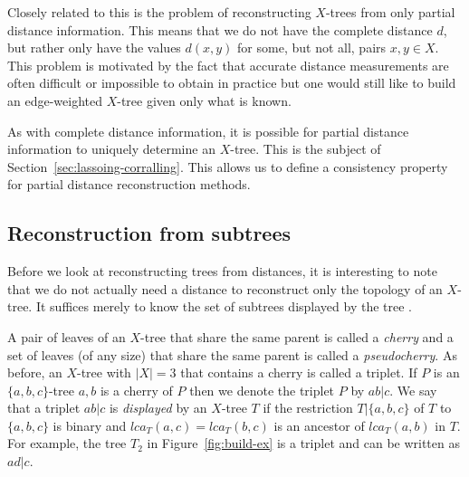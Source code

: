 Closely related to this is the problem of reconstructing $X$-trees from only
partial distance information.  This means that we do not have the complete
distance $d$, but rather only have the values $d(x,y)$ for some, but not all,
pairs $x,y \in X$.  This problem is motivated by the fact that accurate
distance measurements are often difficult or impossible to obtain in practice
but one would still like to build an edge-weighted $X$-tree given only what is
known.

As with complete distance information, it is possible for partial distance
information to uniquely determine an $X$-tree.  This is the subject of
Section~\ref{sec:lassoing-corralling}.  This allows us to define a consistency
property for partial distance reconstruction methods.

\subsection{Reconstruction from subtrees}
\label{sec:constr-from-subtr}

Before we look at reconstructing trees from distances, it is interesting to
note that we do not actually need a distance to reconstruct only the topology
of an $X$-tree.  It suffices merely to know the set of subtrees displayed by
the tree \cite{semple2003phylogenetics}.

A pair of leaves of an $X$-tree that share the same parent is called a
\textit{cherry} and a set of leaves (of any size) that share the same parent
is called a \textit{pseudocherry}.  As before, an $X$-tree with $|X| = 3$ that
contains a cherry is called a triplet.  If $P$ is an $\{a,b,c\}$-tree $a,b$ is
a cherry of $P$ then we denote the triplet $P$ by $ab|c$.  We say that a
triplet $ab|c$ is \textit{displayed} by an $X$-tree $T$ if the restriction
$T|\{a,b,c\}$ of $T$ to $\{a,b,c\}$ is binary and $lca_T(a,c) = lca_T(b,c)$ is
an ancestor of $lca_T(a,b)$ in $T$.  For example, the tree $T_2$ in
Figure~\ref{fig:build-ex} is a triplet and can be written as $ad|c$.

